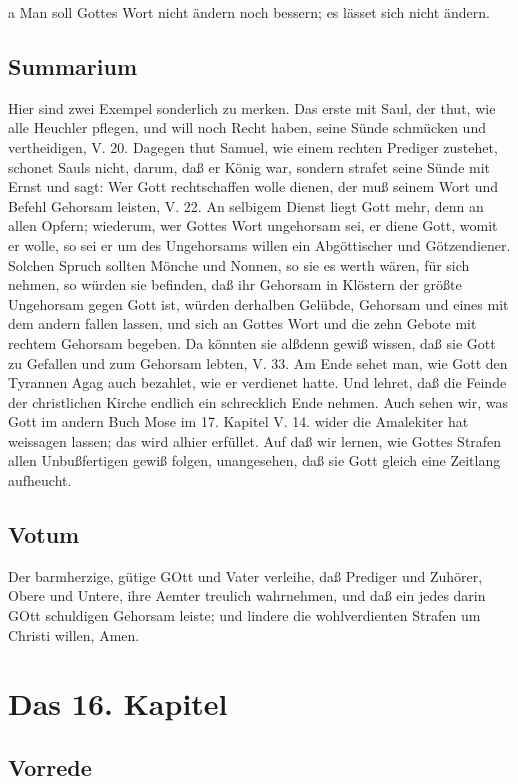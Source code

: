 a Man soll Gottes Wort nicht ändern noch bessern; es lässet sich nicht ändern.

\section{Summarium}

Hier sind zwei Exempel sonderlich zu merken. Das erste mit Saul, der thut, wie alle Heuchler pflegen, und will noch Recht haben, seine Sünde schmücken und vertheidigen, V. 20. Dagegen thut Samuel, wie einem rechten Prediger zustehet, schonet Sauls nicht, darum, daß er König war, sondern strafet seine Sünde mit Ernst und sagt: Wer Gott rechtschaffen wolle dienen, der muß seinem Wort und Befehl Gehorsam leisten, V. 22. An selbigem Dienst liegt Gott mehr, denn an allen Opfern; wiederum, wer Gottes Wort ungehorsam sei, er diene Gott, womit er wolle, so sei er um des Ungehorsams willen ein Abgöttischer und Götzendiener. Solchen Spruch sollten Mönche und Nonnen, so sie es werth wären, für sich nehmen, so würden sie befinden, daß ihr Gehorsam in Klöstern der größte Ungehorsam gegen Gott ist, würden derhalben Gelübde, Gehorsam und eines mit dem andern fallen lassen, und sich an Gottes Wort und die zehn Gebote mit rechtem Gehorsam begeben. Da könnten sie alßdenn gewiß wissen, daß sie Gott zu Gefallen und zum Gehorsam lebten, V. 33. Am Ende sehet man, wie Gott den Tyrannen Agag auch bezahlet, wie er verdienet hatte. Und lehret, daß die Feinde der christlichen Kirche endlich ein schrecklich Ende nehmen. Auch sehen wir, was Gott im andern Buch Mose im 17. Kapitel V. 14. wider die Amalekiter hat weissagen lassen; das wird alhier erfüllet. Auf daß wir lernen, wie Gottes Strafen allen Unbußfertigen gewiß folgen, unangesehen, daß sie Gott gleich eine Zeitlang aufheucht.

\section{Votum}

Der barmherzige, gütige GOtt und Vater verleihe, daß Prediger und Zuhörer, Obere und Untere, ihre Aemter treulich wahrnehmen, und daß ein jedes darin GOtt schuldigen Gehorsam leiste; und lindere die wohlverdienten Strafen um Christi willen, Amen.

\chapter{Das 16. Kapitel}

\section{Vorrede}

